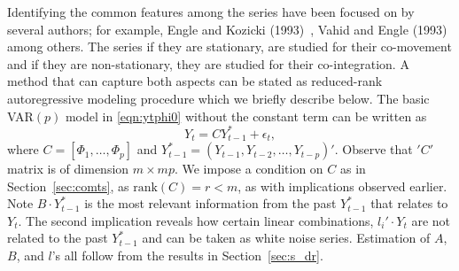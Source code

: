 Identifying the common features among the series have been focused on by several authors; for example, Engle and Kozicki (1993)~\cite{koz93}, Vahid and Engle (1993)~\cite{vah93} among others. The series if they are stationary, are studied for their co-movement and if they are non-stationary, they are studied for their co-integration. A method that can capture both aspects can be stated as reduced-rank autoregressive modeling procedure which we briefly describe below. The basic VAR$(p)$ model in \eqref{eqn:ytphi0} without the constant term can be written as
	\begin{equation} \label{eqn:2ytcyt}
	Y_t = CY_{t-1}^*+\epsilon_t,
	\end{equation}
where $C=[\Phi_1, \ldots, \Phi_p]$ and $Y_{t-1}^*= (Y_{t-1}, Y_{t-2}, \ldots, Y_{t-p})'$. Observe that $'C'$ matrix is of dimension $m \times mp$. We impose a condition on $C$ as in Section~\ref{sec:comts}, as $\text{rank}(C)= r < m$, as with implications observed earlier. Note $B \cdot Y_{t-1}^*$ is the most relevant information from the past $Y_{t-1}^*$ that relates to $Y_t$. The second implication reveals how certain linear combinations, $l_i' \cdot Y_t$ are not related to the past $Y_{t-1}^*$ and can be taken as white noise series. Estimation of $A$, $B$, and $l$'s all follow from the results in Section~\ref{sec:s_dr}. 


